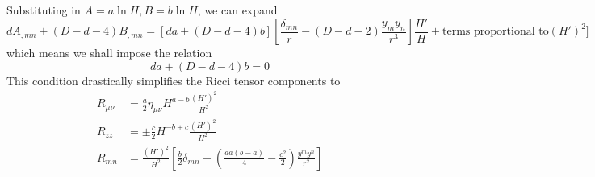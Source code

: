 Substituting in $A = a\ln H, B = b\ln H$, we can expand
\begin{equation}
d A_{,mn} + (D-d-4)B_{,mn}
=[da+(D-d-4)b]
\left[\frac{\delta_{mn}}{r}-(D-d-2)\frac{y_my_n}{r^3}\right]\frac{H'}{H}
+\text{terms proportional to} (H')^2]
\end{equation}
which means we shall impose the relation
\begin{equation}
da+(D-d-4)b = 0
\end{equation}
This condition drastically simplifies the Ricci tensor components to
\begin{align}
R_{\mu\nu}
&=\frac{a}{2}\eta_{\mu\nu}H^{a-b}\frac{(H')^2}{H^2}\\
R_{zz}
&=\pm\frac{c}{2}H^{-b\pm c}\frac{(H')^2}{H^2}\\
R_{mn}
&=\frac{(H')^2}{H^2}\left[\frac{b}{2}\delta_{mn} + \left(\frac{da(b-a)}{4} - \frac{c^2}{2}\right)\frac{y^m y^n}{r^2}\right]
\end{align}
